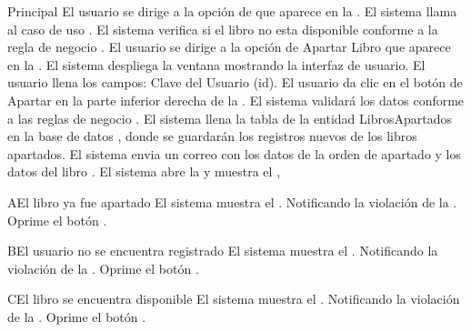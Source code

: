 	\begin{UCtrayectoria}{Principal}
		\UCpaso[\UCactor] El usuario se dirige a la opción de  que aparece en la .
		\UCpaso[\UCsist] El sistema llama al caso de uso .
		\UCpaso[\UCsist] El sistema verifica si el libro no esta disponible conforme a la regla de negocio .
		\UCpaso[\UCactor] El usuario se dirige a la opción de  Apartar Libro que aparece en la .
		\UCpaso[\UCsist] El sistema despliega la ventana  mostrando la interfaz de usuario.
		\UCpaso[\UCactor] El usuario llena los campos: Clave del Usuario (id).
		\UCpaso[\UCactor] El usuario da clic en el botón de Apartar en la parte inferior derecha de la .
		\UCpaso[\UCsist] El sistema validará los datos conforme a las reglas de negocio .
		\UCpaso[\UCsist] El sistema llena la tabla de la entidad LibrosApartados en la base de datos , donde se guardarán los registros nuevos de los libros apartados. 
		\UCpaso[\UCsist] El sistema envia un correo con los datos de la orden de apartado y los datos del libro .		
		\UCpaso[\UCsist] El sistema abre la  y muestra el ,
	\end{UCtrayectoria}
		\begin{UCtrayectoriaA}{A}{El libro ya fue apartado}
			\UCpaso[\UCsist] El sistema muestra el . Notificando la violación de la .
			\UCpaso[\UCactor] Oprime el botón .
		\end{UCtrayectoriaA}
		
		\begin{UCtrayectoriaA}{B}{El usuario no se encuentra registrado}
			\UCpaso[\UCsist] El sistema muestra el . Notificando la violación de la .
			\UCpaso[\UCactor] Oprime el botón .
		\end{UCtrayectoriaA}
		
		\begin{UCtrayectoriaA}{C}{El libro se encuentra disponible}
			\UCpaso[\UCsist] El sistema muestra el . Notificando la violación de la .
			\UCpaso[\UCactor] Oprime el botón .
		\end{UCtrayectoriaA}
		
